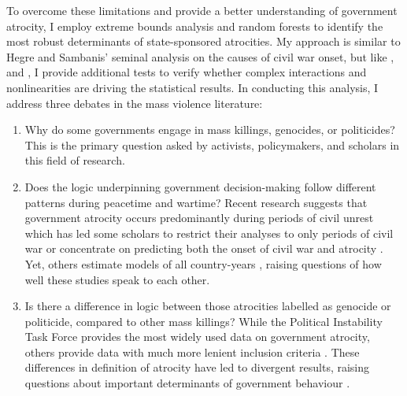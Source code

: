 \documentclass[a4paper,12pt]{article}
\begin{document}
To overcome these limitations and provide a better understanding of government atrocity, I employ extreme bounds analysis and random forests to identify the most robust determinants of state-sponsored atrocities. My approach is similar to Hegre and Sambanis' \citeyear{hegre2006sensitivity} seminal analysis on the causes of civil war onset, but like \citet{bell2015examining}, \citep{hill
} and \citet{jones2018there}, I provide additional tests to verify whether complex interactions and nonlinearities are driving the statistical results. In conducting this analysis, I address three debates in the mass violence literature:
	
\begin{enumerate}
 \item Why do some governments engage in mass killings, genocides, or politicides? This is the primary question asked by activists, policymakers, and scholars in this field of research. 
 \item Does the logic underpinning government decision-making follow different patterns during peacetime and wartime? Recent research suggests that government atrocity occurs predominantly during periods of civil unrest \citep{harff2003no} which has led some scholars to restrict their analyses to only periods of civil war \citep[e.g.,][]{colaresi2008kill, valentino2004draining} or concentrate on predicting both the onset of civil war and atrocity \citep{goldsmith2013forecasting}. Yet, others estimate models of all country-years \citep[e.g.,][]{krain1997state, montalvo2008discrete}, raising questions of how well these studies speak to each other.
 \item Is there a difference in logic between those atrocities labelled as genocide or politicide, compared to other mass killings? While the Political Instability Task Force \citep{marshall2017pitf} provides the most widely used data on government atrocity, others provide data with much more lenient inclusion criteria \citep[e.g.,][]{stanton2015regulating, ulfelder2012forecasting}. These differences in definition of atrocity have led to divergent results, raising questions about important determinants of government behaviour \citep[for discussion, see][]{straus2007second, uzonyi2016domestic, wayman2010explaining}.
\end{enumerate}
\end{document}
